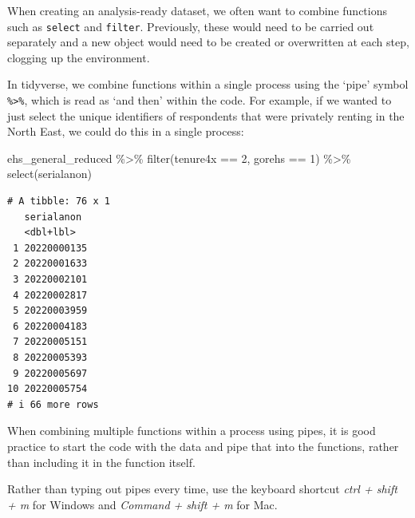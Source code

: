 \documentclass[
  letterpaper,
  DIV=11,
  numbers=noendperiod]{scrreprt}
\newenvironment{Shaded}{\begin{snugshade}}{\end{snugshade}}
\newcommand{\DecValTok}[1]{\textcolor[rgb]{0.68,0.00,0.00}{#1}}
\newcommand{\FunctionTok}[1]{\textcolor[rgb]{0.28,0.35,0.67}{#1}}
\newcommand{\NormalTok}[1]{\textcolor[rgb]{0.00,0.23,0.31}{#1}}
\newcommand{\SpecialCharTok}[1]{\textcolor[rgb]{0.37,0.37,0.37}{#1}}
\begin{document}
When creating an analysis-ready dataset, we often want to combine
functions such as \texttt{select} and \texttt{filter}. Previously, these
would need to be carried out separately and a new object would need to
be created or overwritten at each step, clogging up the environment.

In tidyverse, we combine functions within a single process using the
`pipe' symbol \texttt{\%\textgreater{}\%}, which is read as `and then'
within the code. For example, if we wanted to just select the unique
identifiers of respondents that were privately renting in the North
East, we could do this in a single process:

\begin{Shaded}
\begin{Highlighting}[]
\NormalTok{ehs\_general\_reduced }\SpecialCharTok{\%\textgreater{}\%} 
  \FunctionTok{filter}\NormalTok{(tenure4x }\SpecialCharTok{==} \DecValTok{2}\NormalTok{, gorehs }\SpecialCharTok{==} \DecValTok{1}\NormalTok{) }\SpecialCharTok{\%\textgreater{}\%} 
  \FunctionTok{select}\NormalTok{(serialanon)}
\end{Highlighting}
\end{Shaded}

\begin{verbatim}
# A tibble: 76 x 1
   serialanon 
   <dbl+lbl>  
 1 20220000135
 2 20220001633
 3 20220002101
 4 20220002817
 5 20220003959
 6 20220004183
 7 20220005151
 8 20220005393
 9 20220005697
10 20220005754
# i 66 more rows
\end{verbatim}

\begin{tcolorbox}[enhanced jigsaw, bottomrule=.15mm, left=2mm, leftrule=.75mm, bottomtitle=1mm, coltitle=black, colbacktitle=quarto-callout-tip-color!10!white, toptitle=1mm, arc=.35mm, breakable, title=\textcolor{quarto-callout-tip-color}{\faLightbulb}\hspace{0.5em}{Style tips}, rightrule=.15mm, toprule=.15mm, opacityback=0, opacitybacktitle=0.6, titlerule=0mm, colback=white, colframe=quarto-callout-tip-color-frame]

When combining multiple functions within a process using pipes, it is
good practice to start the code with the data and pipe that into the
functions, rather than including it in the function itself.

\end{tcolorbox}

\begin{tcolorbox}[enhanced jigsaw, bottomrule=.15mm, left=2mm, leftrule=.75mm, bottomtitle=1mm, coltitle=black, colbacktitle=quarto-callout-note-color!10!white, toptitle=1mm, arc=.35mm, breakable, title=\textcolor{quarto-callout-note-color}{\faInfo}\hspace{0.5em}{Helpful hint}, rightrule=.15mm, toprule=.15mm, opacityback=0, opacitybacktitle=0.6, titlerule=0mm, colback=white, colframe=quarto-callout-note-color-frame]

Rather than typing out pipes every time, use the keyboard shortcut
\emph{ctrl + shift + m} for Windows and \emph{Command + shift + m} for
Mac.

\end{tcolorbox}
\end{document}
